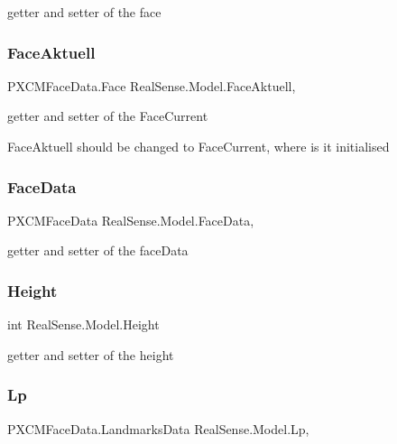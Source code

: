 getter and setter of the face \mbox{\label{class_real_sense_1_1_model_a3621c14d22c3709775971fed725c2781}} 
\subsubsection{Face\+Aktuell}
{\footnotesize\ttfamily P\+X\+C\+M\+Face\+Data.\+Face Real\+Sense.\+Model.\+Face\+Aktuell\hspace{0.3cm}{\ttfamily [get]}, {\ttfamily [set]}}

getter and setter of the Face\+Current

Face\+Aktuell should be changed to Face\+Current, where is it initialised \mbox{\label{class_real_sense_1_1_model_a0d16c2536a9f3c346cc3d51b3227989e}} 
\subsubsection{Face\+Data}
{\footnotesize\ttfamily P\+X\+C\+M\+Face\+Data Real\+Sense.\+Model.\+Face\+Data\hspace{0.3cm}{\ttfamily [get]}, {\ttfamily [set]}}

getter and setter of the face\+Data \mbox{\label{class_real_sense_1_1_model_abf6324c9f4acc3134909a239eff37a0a}} 
\subsubsection{Height}
{\footnotesize\ttfamily int Real\+Sense.\+Model.\+Height\hspace{0.3cm}{\ttfamily [get]}}

getter and setter of the height \mbox{\label{class_real_sense_1_1_model_a3e349d000d00015a340954ec3be977ea}} 
\subsubsection{Lp}
{\footnotesize\ttfamily P\+X\+C\+M\+Face\+Data.\+Landmarks\+Data Real\+Sense.\+Model.\+Lp\hspace{0.3cm}{\ttfamily [get]}, {\ttfamily [set]}}

